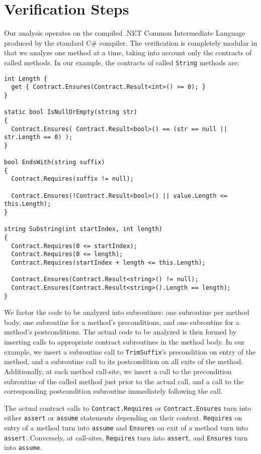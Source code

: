 \documentclass{llncs}
\newcommand{\code}[1]{\lstinline{#1}}
\begin{document}
  
\section{Verification Steps}
Our analysis operates on the compiled .NET Common Intermediate
Language~\cite{MSIL} produced by the standard C\# compiler. The verification is completely modular in that we
analyze one method at a time, taking into account only the contracts
of called methods. In our example, the contracts of called \code{String} methods are:
\begin{lstlisting}
int Length {
  get { Contract.Ensures(Contract.Result<int>() >= 0); }
}

static bool IsNullOrEmpty(string str)
{
  Contract.Ensures( Contract.Result<bool>() == (str == null || str.Length == 0) );
}

bool EndsWith(string suffix)
{
  Contract.Requires(suffix != null);

  Contract.Ensures(!Contract.Result<bool>() || value.Length <= this.Length);
}

string Substring(int startIndex, int length)
{
  Contract.Requires(0 <= startIndex);
  Contract.Requires(0 <= length);
  Contract.Requires(startIndex + length <= this.Length);

  Contract.Ensures(Contract.Result<string>() != null);
  Contract.Ensures(Contract.Result<string>().Length == length);
}
\end{lstlisting}
We factor the code to be analyzed into subroutines: one subroutine per method
body, one subroutine for a method's preconditions, and one subroutine
for a method's postconditions. The actual code to be analyzed is then
formed by inserting calls to appropriate contract subroutines in the
method body. In our example, we insert a subroutine call to
\code{TrimSuffix}'s precondition on entry of the method, and a
subroutine call to its postcondition on all exits of the
method. Additionally, at each method call-site, we insert a
call to the precondition subroutine of the called method just prior to
the actual call, and a call to the corresponding postcondition subroutine
immediately following the call.

The actual contract calls to \code{Contract.Requires} or
\code{Contract.Ensures} turn into either \code{assert} or
\code{assume} statements depending on their context. \code{Requires} on entry of a method turn into
\code{assume} and \code{Ensures} on exit of a method turn into
\code{assert}. Conversely, at call-sites, \code{Requires} turn into
\code{assert}, and \code{Ensures} turn into \code{assume}.
\end{document}
